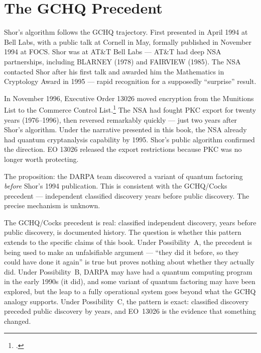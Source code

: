 \section*{The GCHQ Precedent}
\label{spine:fg-the-gchq-precedent}


Shor's algorithm follows the GCHQ trajectory. First presented in April 1994 at Bell Labs, with a public talk at Cornell in May, formally published in November 1994 at FOCS. Shor was at AT\&T Bell Labs --- AT\&T had deep NSA partnerships, including BLARNEY (1978) and FAIRVIEW (1985). The NSA contacted Shor after his first talk and awarded him the Mathematics in Cryptology Award in 1995 --- rapid recognition for a supposedly ``surprise'' result.

In November 1996, Executive Order 13026 moved encryption from the Munitions List to the Commerce Control List.\footcite{eo13026} The NSA had fought PKC export for twenty years (1976--1996), then reversed remarkably quickly --- just two years after Shor's algorithm. Under the narrative presented in this book, the NSA already had quantum cryptanalysis capability by 1995. Shor's public algorithm confirmed the direction. EO 13026 released the export restrictions because PKC was no longer worth protecting.

The proposition: the DARPA team discovered a variant of quantum factoring \textit{before} Shor's 1994 publication. This is consistent with the GCHQ/Cocks precedent --- independent classified discovery years before public discovery. The precise mechanism is unknown.

The GCHQ/Cocks precedent is real: classified independent discovery, years before public discovery, is documented history. The question is whether this pattern extends to the specific claims of this book. Under Possibility~A, the precedent is being used to make an unfalsifiable argument --- ``they did it before, so they could have done it again'' is true but proves nothing about whether they actually did. Under Possibility~B, DARPA may have had a quantum computing program in the early 1990s (it did), and some variant of quantum factoring may have been explored, but the leap to a fully operational system goes beyond what the GCHQ analogy supports. Under Possibility~C, the pattern is exact: classified discovery preceded public discovery by years, and EO~13026 is the evidence that something changed.

\chapterreturn
